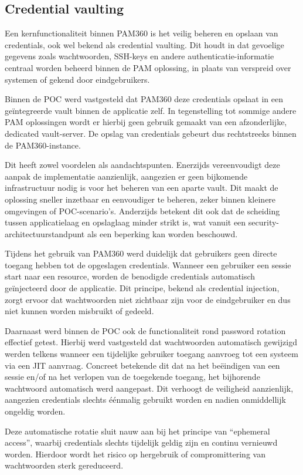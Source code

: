 \subsection{Credential vaulting}
Een kernfunctionaliteit binnen PAM360 is het veilig beheren en opslaan van credentials, ook wel bekend als credential vaulting. Dit houdt in dat gevoelige gegevens zoals wachtwoorden, SSH-keys en andere authenticatie-informatie centraal worden beheerd binnen de PAM oplossing, in plaats van verspreid over systemen of gekend door eindgebruikers.

Binnen de POC werd vastgesteld dat PAM360 deze credentials opslaat in een geïntegreerde vault binnen de applicatie zelf. In tegenstelling tot sommige andere PAM oplossingen wordt er hierbij geen gebruik gemaakt van een afzonderlijke, dedicated vault-server. De opslag van credentials gebeurt dus rechtstreeks binnen de PAM360-instance.

Dit heeft zowel voordelen als aandachtspunten. Enerzijds vereenvoudigt deze aanpak de implementatie aanzienlijk, aangezien er geen bijkomende infrastructuur nodig is voor het beheren van een aparte vault. Dit maakt de oplossing sneller inzetbaar en eenvoudiger te beheren, zeker binnen kleinere omgevingen of POC-scenario’s. Anderzijds betekent dit ook dat de scheiding tussen applicatielaag en opslaglaag minder strikt is, wat vanuit een security-architectuurstandpunt als een beperking kan worden beschouwd.

Tijdens het gebruik van PAM360 werd duidelijk dat gebruikers geen directe toegang hebben tot de opgeslagen credentials. Wanneer een gebruiker een sessie start naar een resource, worden de benodigde credentials automatisch geïnjecteerd door de applicatie. Dit principe, bekend als credential injection, zorgt ervoor dat wachtwoorden niet zichtbaar zijn voor de eindgebruiker en dus niet kunnen worden misbruikt of gedeeld.

Daarnaast werd binnen de POC ook de functionaliteit rond password rotation effectief getest. Hierbij werd vastgesteld dat wachtwoorden automatisch gewijzigd werden telkens wanneer een tijdelijke gebruiker toegang aanvroeg tot een systeem via een JIT aanvraag. Concreet betekende dit dat na het beëindigen van een sessie en/of na het verlopen van de toegekende toegang, het bijhorende wachtwoord automatisch werd aangepast. Dit verhoogt de veiligheid aanzienlijk, aangezien credentials slechts éénmalig gebruikt worden en nadien onmiddellijk ongeldig worden.

Deze automatische rotatie sluit nauw aan bij het principe van “ephemeral access”, waarbij credentials slechts tijdelijk geldig zijn en continu vernieuwd worden. Hierdoor wordt het risico op hergebruik of compromittering van wachtwoorden sterk gereduceerd.

